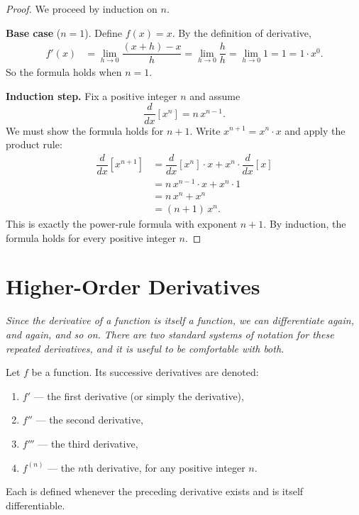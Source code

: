 \begin{proof}
We proceed by induction on $n$.

\textbf{Base case} ($n = 1$).  Define $f(x) = x$.  By the definition of derivative,
\begin{align*}
  f'(x) &= \lim_{h \to 0} \dfrac{(x+h) - x}{h} = \lim_{h \to 0} \dfrac{h}{h} = \lim_{h \to 0} 1 = 1 = 1 \cdot x^{0}.
\end{align*}
So the formula holds when $n = 1$.

\textbf{Induction step.}  Fix a positive integer $n$ and assume
\[
  \dfrac{d}{dx}\!\left[x^{n}\right] = n\,x^{n-1}.
\]
We must show the formula holds for $n + 1$.  Write $x^{n+1} = x^{n} \cdot x$ and apply the product rule:
\begin{align*}
  \dfrac{d}{dx}\!\left[x^{n+1}\right]
  &= \dfrac{d}{dx}\!\left[x^{n}\right] \cdot x + x^{n} \cdot \dfrac{d}{dx}[x] \\
  &= n\,x^{n-1} \cdot x + x^{n} \cdot 1 \\
  &= n\,x^{n} + x^{n} \\
  &= (n+1)\,x^{n}.
\end{align*}
This is exactly the power-rule formula with exponent $n + 1$.  By induction, the formula holds for every positive integer $n$.
\end{proof}

\section{Higher-Order Derivatives}
\label{sec:3.8}

\textit{Since the derivative of a function is itself a function, we can differentiate again, and again, and so on.  There are two standard systems of notation for these repeated derivatives, and it is useful to be comfortable with both.}

\begin{definition}
\label{def:3-6}
Let $f$ be a function.  Its successive derivatives are denoted:
\begin{enumerate}[label=(\roman*)]
  \item $f'$ --- the first derivative (or simply the derivative),
  \item $f''$ --- the second derivative,
  \item $f'''$ --- the third derivative,
  \item $f^{(n)}$ --- the $n$th derivative, for any positive integer $n$.
\end{enumerate}
Each is defined whenever the preceding derivative exists and is itself differentiable.
\end{definition}

